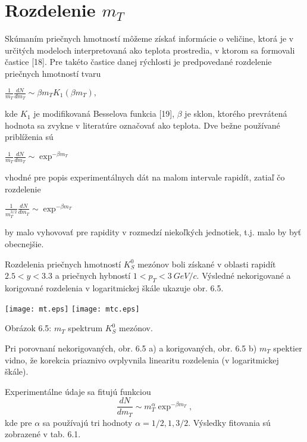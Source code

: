 \section{Rozdelenie $m_{T}$}
Skúmaním  priečnych hmotností  môžeme získať  informácie o
veličine, ktorá je v určitých modeloch interpretovaná ako teplota
prostredia, v ktorom sa formovali častice [18]. Pre takéto častice danej
rýchlosti je predpovedané  rozdelenie priečnych hmotností  tvaru
\begin{center}
  $\frac{1}{m_{T}}\frac{dN}{dm_{T}}\sim\beta m_{T} K_{1} (\beta m_{T}),$
\end{center}
kde $K_{1}$ je modifikovaná Besselova funkcia [19], $\beta$ je sklon, ktorého
prevrátená hodnota  sa zvykne v literatúre označovať ako  teplota.  Dve bežne
používané priblíženia sú
\begin{center}
 $ \frac{1}{m_{T}}\frac{dN}{dm_{T}}\sim \exp^{-\beta m_{T}}$
\end{center}
vhodné pre popis experimentálnych dát  na malom intervale rapidít, zatiaľ čo
rozdelenie
\begin{center}
$ \frac{1}{m_{T}^{3/2}}\frac{dN}{dm_{T}}\sim \exp^{-\beta m_{T}} $
\end{center}
by  malo vyhovovať pre rapidity v rozmedzí niekoľkých jednotiek, t.j.  malo
by byť obecnejšie. 

Rozdelenia priečnych hmotností $K^{0}_{S}$ mezónov boli získané v oblasti
rapidít $2.5<y<3.3$ a priečnych hybností $1<p_{T}<3\: GeV/c$. Výsledné
nekorigované a korigované rozdelenia v logaritmickej škále ukazuje obr. 6.5.

\newpage 
\begin{center}
  \texttt{[image: mt.eps]}
  \texttt{[image: mtc.eps]}
\end{center}
\begin{center}
  Obrázok 6.5: $m_{T}$ spektrum $K^{0}_{S}$ mezónov.
\end{center}
Pri porovnaní nekorigovaných, obr. 6.5 a) a korigovaných, obr. 6.5 b)
$m_{T}$  spektier vidno, že korekcia priaznivo ovplyvnila linearitu
rozdelenia (v logaritmickej škále).

Experimentálne údaje sa fitujú funkciou
\begin{equation}
  \frac{dN}{dm_{T}} \sim m_{T}^{\alpha}\exp^{-\beta m_{T}},
\end{equation}
kde pre $\alpha$ sa používajú tri hodnoty $\alpha=1/2, 1, 3/2$.
Výsledky fitovania sú zobrazené v tab. 6.1.

